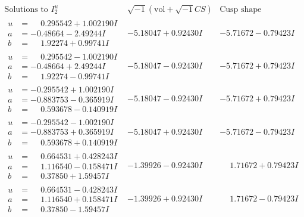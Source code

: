\documentclass[1p]{elsarticle_modified}
\theoremstyle{definition}
\newcommand{\I}{\sqrt{-1}}
\begin{document}
$$\begin{array}{c|c|c}  
\text{Solutions to }I^u_{2}& \I (\text{vol} + \sqrt{-1}CS) & \text{Cusp shape}\\
 \hline 
\begin{aligned}
u &= \phantom{-}0.295542 + 1.002190 I \\
a &= -0.48664 - 2.49244 I \\
b &= \phantom{-}1.92274 + 0.99741 I\end{aligned}
 & -5.18047 + 0.92430 I & -5.71672 - 0.79423 I \\ \hline\begin{aligned}
u &= \phantom{-}0.295542 - 1.002190 I \\
a &= -0.48664 + 2.49244 I \\
b &= \phantom{-}1.92274 - 0.99741 I\end{aligned}
 & -5.18047 - 0.92430 I & -5.71672 + 0.79423 I \\ \hline\begin{aligned}
u &= -0.295542 + 1.002190 I \\
a &= -0.883753 - 0.365919 I \\
b &= \phantom{-}0.593678 - 0.140919 I\end{aligned}
 & -5.18047 - 0.92430 I & -5.71672 + 0.79423 I \\ \hline\begin{aligned}
u &= -0.295542 - 1.002190 I \\
a &= -0.883753 + 0.365919 I \\
b &= \phantom{-}0.593678 + 0.140919 I\end{aligned}
 & -5.18047 + 0.92430 I & -5.71672 - 0.79423 I \\ \hline\begin{aligned}
u &= \phantom{-}0.664531 + 0.428243 I \\
a &= \phantom{-}1.116540 - 0.158471 I \\
b &= \phantom{-}0.37850 + 1.59457 I\end{aligned}
 & -1.39926 - 0.92430 I & \phantom{-}1.71672 + 0.79423 I \\ \hline\begin{aligned}
u &= \phantom{-}0.664531 - 0.428243 I \\
a &= \phantom{-}1.116540 + 0.158471 I \\
b &= \phantom{-}0.37850 - 1.59457 I\end{aligned}
 & -1.39926 + 0.92430 I & \phantom{-}1.71672 - 0.79423 I \\ \hline\begin{aligned}

\end{aligned}
\end{array}$$
\end{document}

